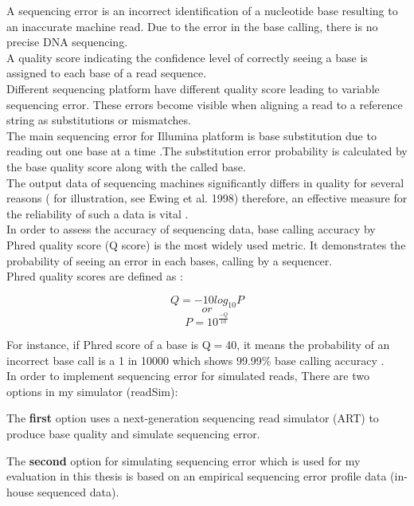 \documentclass[11pt,a4paper]{report}
\begin{document}
A sequencing error is an incorrect identification of a nucleotide base resulting 
to an inaccurate machine read. Due to the error in the base calling, there is no 
precise DNA sequencing. \\
A quality score indicating the confidence level of correctly seeing a base is 
assigned to each base of a read sequence.\\
Different sequencing platform have different quality score leading to variable 
sequencing error. These errors become visible when aligning a read to a reference 
string as substitutions or mismatches.\\
The main sequencing error for Illumina platform is base substitution due to 
reading out one base at a time \cite{art}.The substitution error probability is 
calculated by the base quality score along with the called base.\\

The output data of sequencing machines significantly differs in quality for 
several reasons ( for illustration, see Ewing et al. 1998) therefore, an effective 
measure for the reliability of such a data is vital \cite{phred1}.\\

In order to assess the accuracy of sequencing data, base calling accuracy by Phred 
quality score (Q score) is the most widely used metric. It demonstrates the probability 
of seeing an error in each bases, calling by a sequencer.\\

Phred quality scores are defined as \cite{phred2}:

$$ Q = -10  log_{10}P   $$
$$  or $$
$$ P = 10 ^ { \frac{-Q}{ 10 } } $$

For instance, if Phred score of a base is Q$=$40, it means the probability of an 
incorrect base call is a 1 in 10000 which shows 99.99\% base calling accuracy 
\cite{IlluminaPhred}. \\  

In order to implement sequencing error for simulated reads, There are two
options in my simulator (readSim):

The \textbf{first} option uses a next-generation sequencing read simulator 
(ART) to produce base quality and simulate sequencing error.


The \textbf{second} option for simulating sequencing error which is used for
my evaluation in this thesis is based on an empirical sequencing error profile 
data (in-house sequenced data).
\end{document}
